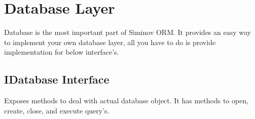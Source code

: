 \newpage
\chapter {\Large{Database Layer}}

Database is the most important part of Siminov ORM. It provides an easy way to implement your own database layer, all you have to do is provide implementation for below interface's. 

\section{IDatabase Interface}
Exposes methods to deal with actual database object. It has methods to open, create, close, and execute query's. 




